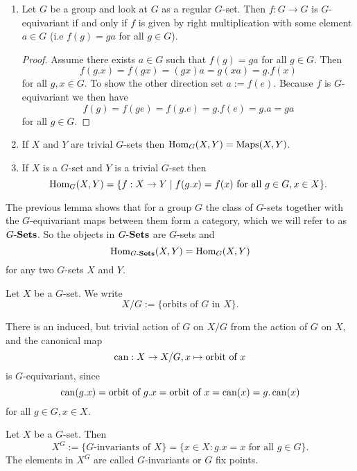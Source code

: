 \begin{expls}
 \begin{enumerate}
  \item
   Let $G$ be a group and look at $G$ as a regular $G$-set. Then $f : G \to G$ is $G$-equivariant if and only if $f$ is given by right multiplication with some element $a \in G$ (i.e $f(g) = ga$ for all $g \in G$).
   \begin{proof}
    Assume there exists $a \in G$ such that $f(g) = ga$ for all $g \in G$. Then
    \[
     f(g.x) = f(gx) = (gx)a = g(xa) = g.f(x)
    \]
    for all $g, x \in G$. To show the other direction set $a := f(e)$. Because $f$ is $G$-equivariant we then have
    \[
     f(g) = f(ge) = f(g.e) = g.f(e) = g.a = ga
    \]
    for all $g \in G$.
   \end{proof}
  \item
   If $X$ and $Y$ are trivial $G$-sets then $\operatorname{Hom}_G(X,Y) = \operatorname{Maps}(X,Y)$.
  \item
   If $X$ is a $G$-set and $Y$ is a trivial $G$-set then
   \[
    \operatorname{Hom}_G(X,Y) = \{f : X \to Y \mid f(g.x) = f(x) \text{ for all } g \in G, x \in X\}.
   \]
 \end{enumerate}
\end{expls}


The previous lemma shows that for a group $G$ the class of $G$-sets together with the $G$-equivariant maps between them form a category, which we will refer to as $G\text{-}\mathbf{Sets}$. So the objects in $G\text{-}\mathbf{Sets}$ are $G$-sets and
\[
 \operatorname{Hom}_{G\text{-}\mathbf{Sets}}(X,Y) = \operatorname{Hom}_G(X,Y)
\]
for any two $G$-sets $X$ and $Y$.


\begin{defi}
 Let $X$ be a $G$-set. We write
 \[
  X/G := \{\text{orbits of $G$ in $X$}\}.
 \]
\end{defi}


\begin{note}
 There is an induced, but trivial action of $G$ on $X/G$ from the action of $G$ on $X$, and the canonical map
 \[
  \operatorname{can} : X \to X/G, x \mapsto \text{orbit of } x
 \]
 is $G$-equivariant, since
 \[
  \operatorname{can}(g.x) = \text{orbit of $g.x$} = \text{orbit of $x$} = \operatorname{can}(x) = g.\operatorname{can}(x)
 \]
 for all $g \in G, x \in X$.
\end{note}


\begin{defi}
 Let $X$ be a $G$-set. Then
 \[
  X^G := \{\text{$G$-invariants of $X$}\} = \{x \in X : g.x = x \text{ for all } g \in G\}.
 \]
 The elements in $X^G$ are called $G$-invariants or $G$ fix points.
\end{defi}



